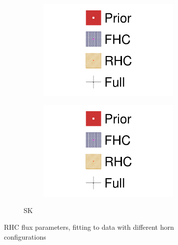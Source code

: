 \begin{figure}[h]
\begin{subfigure}[t]{\textwidth}
\begin{subfigure}[t]{0.24\textwidth}
			\includegraphics[width=\textwidth,page=16, trim={0mm 0mm 0mm 9mm}, clip]{figures/mach3/2018/data/2018a_FixedCov_RedCov_Mpi_NeuOnly_Data_merge_2018a_FixedCov_RedCov_Mpi_NeuBarOnly_Data_merge_2018a_FixedCov_RedCov_Mpi_Data_merge}
		\end{subfigure}
		\begin{subfigure}[t]{0.24\textwidth}
			\includegraphics[width=\textwidth,page=17, trim={0mm 0mm 0mm 9mm}, clip]{figures/mach3/2018/data/2018a_FixedCov_RedCov_Mpi_NeuOnly_Data_merge_2018a_FixedCov_RedCov_Mpi_NeuBarOnly_Data_merge_2018a_FixedCov_RedCov_Mpi_Data_merge}
		\end{subfigure}
		\caption{SK}
	\end{subfigure}
	\caption{RHC flux parameters, fitting to data with different horn configurations}
	\label{fig:data_fhcvsrhc_2018_rhc}
\end{figure}

